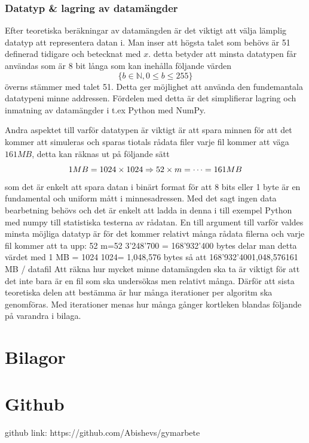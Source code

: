 \documentclass[a4paper]{article}
\renewcommand{\appendixpagename}{Bilagor}
\begin{document}
\subsubsection{Datatyp \& lagring av datamängder}
Efter teoretiska beräkningar av datamängden är det viktigt att välja lämplig
datatyp att representera datan i. Man inser att högsta talet som behövs är 51
definerad tidigare och betecknat med $x$. 
detta betyder att minsta datatypen får användas som är 8 bit långa som kan
inehålla följande värden $$\{b \in \mathbb{N},  0 \leq b \leq 255 \}$$ överns\-
stämmer med talet 51. Detta ger möjlighet att använda den fundemantala datatypeni minne addressen. Fördelen med detta är det simplifierar lagring och inmatning
av datamängder i t.ex Python med NumPy.

Andra aspektet till varför datatypen är viktigt är att spara minnen för att det
kommer att simuleras och sparas tiotals rådata filer varje fil kommer att väga
$161 MB$,
detta kan räknas ut på följande sätt $$ 1 MB = 1024 \times 1024 \Rightarrow \\
52 \times m = \dots = 161 MB $$
som det är enkelt att spara datan i binärt format för att 8 bits eller 1 byte
är en fundamental och uniform mått i minnesadressen. Med det sagt ingen data
bearbetning behövs och det är enkelt att ladda in denna i till exempel Python
med numpy till statistiska testerna av rådatan. En till argument till varför
valdes  minsta möjliga datatyp är för det kommer relativt många rådata
filerna och varje fil kommer att ta upp: 52 m=52   3'248'700 = 168'932'400
bytes delar man detta värdet med 1 MB = 1024  1024= 1,048,576 bytes  så att
168'932'4001,048,576161 MB / datafil    Att räkna hur mycket minne
datamängden ska ta är viktigt för att det inte bara är en fil som ska
undersökas men relativt många. Därför att sista teoretiska delen att bestämma
är hur många iterationer per algoritm ska genomföras. Med iterationer menas
hur många gånger kortleken blandas följande på varandra i bilaga.


\printbibliography[heading=bibintoc, title={Referenser}]

\appendix
\section*{\appendixpagename} 
\addcontentsline{toc}{section}{\appendixpagename} 

\section{Github}
\label{app:github}
github link: https://github.com/Abishevs/gymarbete
\end{document}
